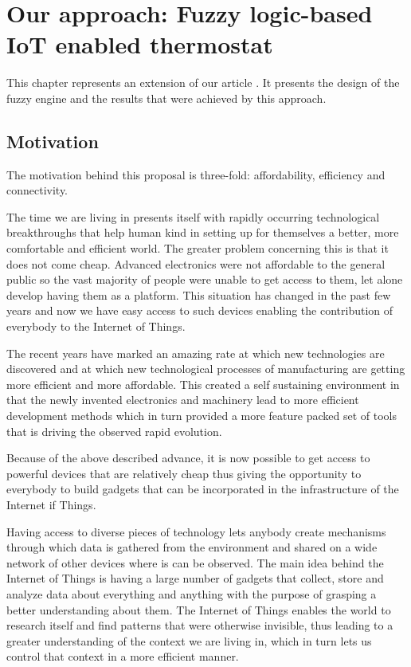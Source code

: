\chapter{Our approach: Fuzzy logic-based IoT enabled thermostat}
\label{chap:concept}

This chapter represents an extension of our article \cite{FuzzyLogicIOT}. It presents the design of the fuzzy
engine and the results that were achieved by this approach.

\section{Motivation}

\qquad The motivation behind this proposal is three-fold: affordability, efficiency and connectivity.

\qquad The time we are living in presents itself with rapidly occurring technological breakthroughs that help human
kind in setting up for themselves a better, more comfortable and efficient world. The greater problem concerning
this is that it does not come cheap. Advanced electronics were not affordable to the general public so the vast
majority of people were unable to get access to them, let alone develop  having them as a platform. This
situation has changed in the past few years and now we have easy access to such devices enabling the
contribution of everybody to the Internet of Things.

\qquad The recent years have marked an amazing rate at which new technologies are discovered and at which new
technological processes of manufacturing are getting more efficient and more affordable. This created a self
sustaining environment in that the newly invented electronics and machinery lead to more efficient
development methods which in turn provided a more feature packed set of tools that is driving the observed
rapid evolution.

Because of the above described advance, it is now possible to get access to powerful devices that are
relatively cheap thus giving the opportunity to everybody to build gadgets that can be incorporated
in the infrastructure of the Internet if Things.

\qquad Having access to diverse pieces of technology lets anybody create mechanisms through which data is gathered
from the environment and shared on a wide network of other devices where is can be observed.
The main idea behind the Internet of Things is having a large number of gadgets that collect, store and
analyze data about everything and anything with the purpose of grasping a better understanding about them.
The Internet of Things enables the world to research itself and find patterns that were otherwise invisible,
thus leading to a greater understanding of the context we are living in, which in turn lets us control that
context in a more efficient manner.

